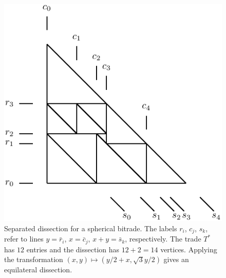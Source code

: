 \documentclass[12pt,amstags,fleqn]{article}
\theoremstyle{plain}
\theoremstyle{definition}
\def\ll{{\textstyle \ast}}
\newcommand{\opa}{\ll}
\begin{document}
\begin{figure}[htbp]
\begin{center}
\includegraphics[scale=0.75]{dissection31.pdf}
\end{center}
\caption{Separated dissection for a spherical bitrade. The labels $r_i$, $c_j$,
$s_k$, refer to lines $y = \bar r_i$,
$x = \bar c_j$,
$x+y = \bar s_k$, respectively. The trade $T^{\opa}$ has $12$ entries
and the dissection has $12 + 2 = 14$ vertices.
Applying the transformation $(x,y) \mapsto (y/2 + x, \sqrt 3 y/2)$ gives
an equilateral dissection.}
\label{fg2}
\end{figure} 
\end{document}

